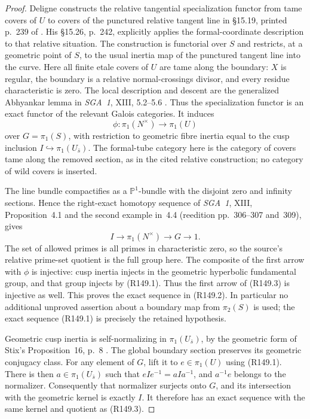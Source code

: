 \documentclass[11pt,a4paper]{article}
\theoremstyle{definition}
\begin{document}
\begin{proof}
Deligne constructs the relative tangential specialization functor
from tame covers of $U$ to covers of the punctured relative tangent
line in \S15.19, printed p.~239 of \cite{DeligneTangential1989}.
His \S15.26, p.~242, explicitly applies the formal-coordinate
description to that relative situation. The construction is
functorial over $S$ and restricts, at a geometric point of $S$, to
the usual inertia map of the punctured tangent line into the curve.
Here all finite etale covers of $U$ are tame along the boundary:
$X$ is regular, the boundary is a relative normal-crossings divisor,
and every residue characteristic is zero. The local description and
descent are the generalized Abhyankar lemma in \emph{SGA~1}, XIII,
5.2--5.6 \cite{SGA1}. Thus the specialization functor is an exact
functor of the relevant Galois categories. It induces
\[
 \phi:\pi_1(N^\times)\longrightarrow\pi_1(U)
\]
over $G=\pi_1(S)$, with restriction to geometric fibre inertia
equal to the cusp inclusion $I\hookrightarrow\pi_1(U_{\bar s})$.
The formal-tube category here is the category of covers tame along
the removed section, as in the cited relative construction; no
category of wild covers is inserted.

The line bundle compactifies as a $\mathbb P^1$-bundle with the
disjoint zero and infinity sections. Hence the right-exact homotopy
sequence of \emph{SGA~1}, XIII, Proposition~4.1 and the second
example in~4.4 (reedition pp.~306--307 and~309), gives
\[
 I\longrightarrow\pi_1(N^\times)\longrightarrow G
 \longrightarrow1.                                           \tag{R149.3}
\]
The set of allowed primes is all primes in characteristic zero,
so the source's relative prime-set quotient is the full group here.
The composite of the first arrow with $\phi$ is injective: cusp
inertia injects in the geometric hyperbolic fundamental group, and
that group injects by (R149.1). Thus the first arrow of (R149.3)
is injective as well. This proves the exact sequence in (R149.2).
In particular no additional unproved assertion about a boundary map
from $\pi_2(S)$ is used; the exact sequence (R149.1) is precisely
the retained hypothesis.

Geometric cusp inertia is self-normalizing in
$\pi_1(U_{\bar s})$, by the geometric form of Stix's
Proposition~16, p.~8 \cite{StixCuspidal2012}.
The global boundary section preserves its geometric conjugacy class.
For any element of $G$, lift it to $e\in\pi_1(U)$ using
(R149.1). There is then $a\in\pi_1(U_{\bar s})$ such that
$eIe^{-1}=aIa^{-1}$, and $a^{-1}e$ belongs to the normalizer.
Consequently that normalizer surjects onto $G$, and its intersection
with the geometric kernel is exactly $I$. It therefore has an exact
sequence with the same kernel and quotient as (R149.3).


\end{proof}
\end{document}
